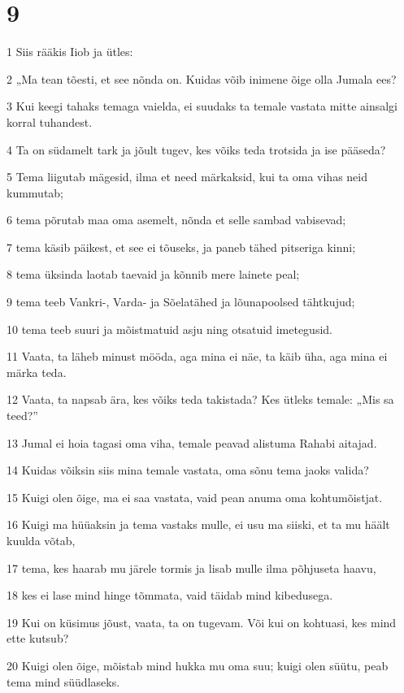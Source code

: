 \chapter{9}

\par 1 Siis rääkis Iiob ja ütles:
\par 2 „Ma tean tõesti, et see nõnda on. Kuidas võib inimene õige olla Jumala ees?
\par 3 Kui keegi tahaks temaga vaielda, ei suudaks ta temale vastata mitte ainsalgi korral tuhandest.
\par 4 Ta on südamelt tark ja jõult tugev, kes võiks teda trotsida ja ise pääseda?
\par 5 Tema liigutab mägesid, ilma et need märkaksid, kui ta oma vihas neid kummutab;
\par 6 tema põrutab maa oma asemelt, nõnda et selle sambad vabisevad;
\par 7 tema käsib päikest, et see ei tõuseks, ja paneb tähed pitseriga kinni;
\par 8 tema üksinda laotab taevaid ja kõnnib mere lainete peal;
\par 9 tema teeb Vankri-, Varda- ja Sõelatähed ja lõunapoolsed tähtkujud;
\par 10 tema teeb suuri ja mõistmatuid asju ning otsatuid imetegusid.
\par 11 Vaata, ta läheb minust mööda, aga mina ei näe, ta käib üha, aga mina ei märka teda.
\par 12 Vaata, ta napsab ära, kes võiks teda takistada? Kes ütleks temale: „Mis sa teed?”
\par 13 Jumal ei hoia tagasi oma viha, temale peavad alistuma Rahabi aitajad.
\par 14 Kuidas võiksin siis mina temale vastata, oma sõnu tema jaoks valida?
\par 15 Kuigi olen õige, ma ei saa vastata, vaid pean anuma oma kohtumõistjat.
\par 16 Kuigi ma hüüaksin ja tema vastaks mulle, ei usu ma siiski, et ta mu häält kuulda võtab,
\par 17 tema, kes haarab mu järele tormis ja lisab mulle ilma põhjuseta haavu,
\par 18 kes ei lase mind hinge tõmmata, vaid täidab mind kibedusega.
\par 19 Kui on küsimus jõust, vaata, ta on tugevam. Või kui on kohtuasi, kes mind ette kutsub?
\par 20 Kuigi olen õige, mõistab mind hukka mu oma suu; kuigi olen süütu, peab tema mind süüdlaseks.

